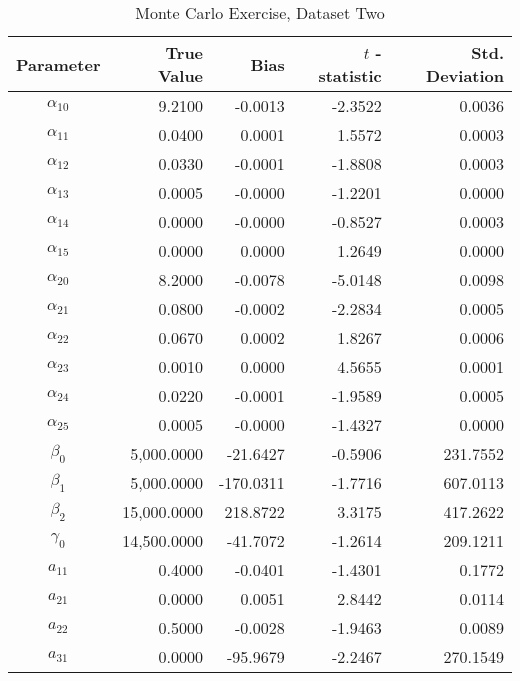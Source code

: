 \begin{table}\onehalfspacing
\begin{center}
\begin{threeparttable}
  \caption{Monte Carlo Exercise, Dataset Two}
  \label{Monte Carlo: Two}
  \begin{tabular}{crrrr}\toprule

  Parameter & True Value & Bias & $t$ - statistic & Std. Deviation \\
  \midrule
  $\alpha_{10}$ &      \phantom{20000}9.2100 &  -0.0013 & -2.3522 &     0.0036 \\
  $\alpha_{11}$ &      0.0400 &      0.0001 &  1.5572 &    0.0003 \\
  $\alpha_{12}$ &      0.0330 &     -0.0001 & -1.8808 &    0.0003 \\
  $\alpha_{13}$ &      0.0005 &     -0.0000 & -1.2201 &    0.0000 \\
  $\alpha_{14}$ &      0.0000 &     -0.0000 & -0.8527 &    0.0003 \\
  $\alpha_{15}$ &      0.0000 &      0.0000 &  1.2649 &    0.0000 \\
  $\alpha_{20}$ &      8.2000 &     -0.0078 & -5.0148 &    0.0098 \\
  $\alpha_{21}$ &      0.0800 &     -0.0002 & -2.2834 &    0.0005 \\
  $\alpha_{22}$ &      0.0670 &      0.0002 &  1.8267 &    0.0006 \\
  $\alpha_{23}$ &      0.0010 &      0.0000 &  4.5655 &    0.0001 \\
  $\alpha_{24}$ &      0.0220 &     -0.0001 & -1.9589 &    0.0005 \\
  $\alpha_{25}$ &      0.0005 &     -0.0000 & -1.4327 &    0.0000 \\
  $\beta_{0}$   &   5,000.0000 &   -21.6427 & -0.5906 &  231.7552 \\
  $\beta_{1}$   &   5,000.0000 &  -170.0311 & -1.7716 &  607.0113 \\
  $\beta_{2}$   &  15,000.0000 &   218.8722 &  3.3175 &  417.2622 \\
  $\gamma_{0}$  &  14,500.0000 &   -41.7072 & -1.2614 &  209.1211 \\
  $a_{11}$      &      0.4000 &     -0.0401 & -1.4301 &    0.1772 \\
  $a_{21}$      &      0.0000 &      0.0051 &  2.8442 &    0.0114 \\
  $a_{22}$      &      0.5000 &     -0.0028 & -1.9463 &    0.0089 \\
  $a_{31}$      &      0.0000 &    -95.9679 & -2.2467 &  270.1549 \\

\end{tabular}
\end{threeparttable}
\end{center}
\end{table}
